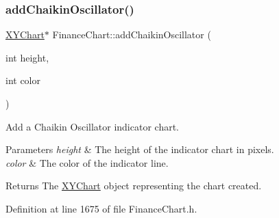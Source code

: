 \subsubsection{\texorpdfstring{add\+Chaikin\+Oscillator()}{addChaikinOscillator()}}
{\footnotesize\ttfamily \hyperlink{class_x_y_chart}{X\+Y\+Chart}$\ast$ Finance\+Chart\+::add\+Chaikin\+Oscillator (\begin{DoxyParamCaption}\item[{int}]{height,  }\item[{int}]{color }\end{DoxyParamCaption})\hspace{0.3cm}{\ttfamily [inline]}}



Add a Chaikin Oscillator indicator chart. 


\begin{DoxyParams}{Parameters}
{\em height} & The height of the indicator chart in pixels.\\
\hline
{\em color} & The color of the indicator line.\\
\hline
\end{DoxyParams}
\begin{DoxyReturn}{Returns}
The \hyperlink{class_x_y_chart}{X\+Y\+Chart} object representing the chart created.
\end{DoxyReturn}


Definition at line 1675 of file Finance\+Chart.\+h.

